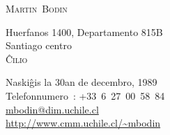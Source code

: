 \documentclass[12pt,a4paper]{article}
\begin{document}
\pagestyle{empty}


\newlength{\annee}
\settowidth{\annee}{9999--9999}


\newlength{\texte}
\setlength{\texte}{\textwidth} \addtolength{\texte}{-\annee} 
	\addtolength{\texte}{-2\tabcolsep}

\begin{center} \Huge \textsc{Martin~Bodin} \end{center}

\parbox[c]{.5\textwidth}
{
  \noindent
  Huerfanos 1400, Departamento 815B \\
  Santiago centro \\
  \textsc{Ĉilio}
}
\parbox[c]{.55\textwidth}
{
\begin{flushright}
  Naskiĝis la 30an de decembro, 1989 \\
  \noindent Telefonnumero~: \mbox{+33 6 27 00 58 84} \\
  \url{mbodin@dim.uchile.cl} \\
  \url{http://www.cmm.uchile.cl/~mbodin}
\end{flushright}
}
\end{document}
